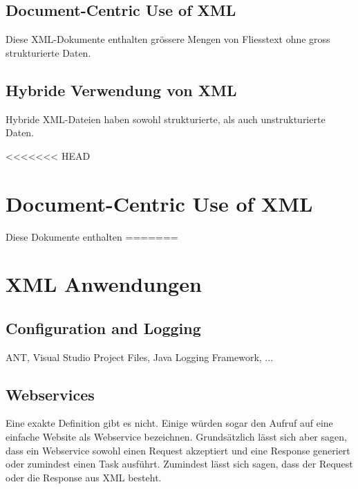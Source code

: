 \subsection{Document-Centric Use of XML}
Diese XML-Dokumente enthalten grössere Mengen von Fliesstext ohne gross strukturierte Daten.

\subsection{Hybride Verwendung von XML}
Hybride XML-Dateien haben sowohl strukturierte, als auch unstrukturierte Daten.

<<<<<<< HEAD
\section{Document-Centric Use of XML}
Diese Dokumente enthalten
=======
\section{XML Anwendungen}
\subsection{Configuration and Logging}
ANT, Visual Studio Project Files, Java Logging Framework, ...
\subsection{Webservices}
Eine exakte Definition gibt es nicht. Einige würden sogar den Aufruf auf eine einfache Website als Webservice bezeichnen. Grundsätzlich lässt sich aber sagen, dass ein Webservice sowohl einen Request akzeptiert und eine Response generiert oder zumindest einen Task ausführt. Zumindest lässt sich sagen, dass der Request oder die Response aus XML besteht.

